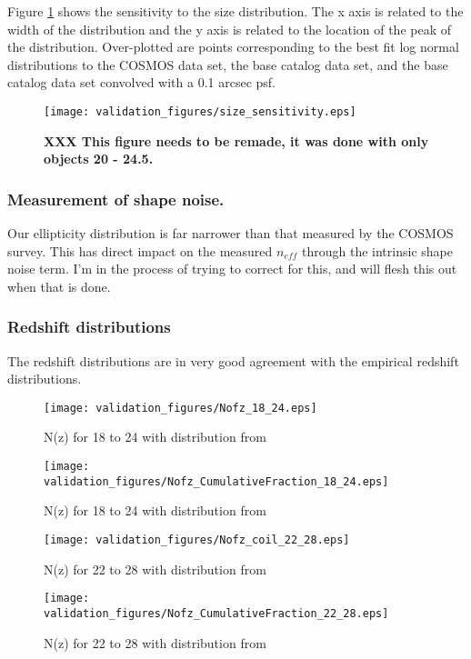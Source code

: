 \documentclass[]{article}
\begin{document}
Figure \ref{fig:size_sens} shows the sensitivity to the size distribution.  The x axis is related to the width of the 
distribution and the y axis is related to the location of the peak of the distribution. Over-plotted are points corresponding
to the best fit log normal distributions to the COSMOS data set, the base catalog data set, and the base catalog data set convolved 
with a 0.1 arcsec psf.
\begin{figure}
\centering
\texttt{[image: validation\_figures/size\_sensitivity.eps]}
\caption{{\bf XXX This figure needs to be remade, it was done with only objects 20 - 24.5.}\label{fig:size_sens}}
\end{figure}

\subsubsection{Measurement of shape noise.}
Our ellipticity distribution is far narrower than that measured by the COSMOS survey.  This has direct impact on the measured
$n_{eff}$ through the intrinsic shape noise term.  I'm in the process of trying to correct for this, and will flesh this out when that is done.


\subsubsection{Redshift distributions}
The redshift distributions are in very good agreement with the \cite{coil} empirical redshift distributions.
\begin{figure}
\centering
\texttt{[image: validation\_figures/Nofz\_18\_24.eps]}
\caption{N(z) for 18 to 24 with distribution from \cite{coil}\label{fig:nofz18_24}}
\end{figure}
\begin{figure}
\centering
\texttt{[image: validation\_figures/Nofz\_CumulativeFraction\_18\_24.eps]}
\caption{N(z) for 18 to 24 with distribution from \cite{coil}\label{fig:nofz18_24_ratio}}
\end{figure}
\begin{figure}
\centering
\texttt{[image: validation\_figures/Nofz\_coil\_22\_28.eps]}
\caption{N(z) for 22 to 28 with distribution from \cite{coil}\label{fig:nofz22_28}}
\end{figure}
\begin{figure}
\centering
\texttt{[image: validation\_figures/Nofz\_CumulativeFraction\_22\_28.eps]}
\caption{N(z) for 22 to 28 with distribution from \cite{coil}\label{fig:nofz22_28_ratio}}
\end{figure}
\end{document}
